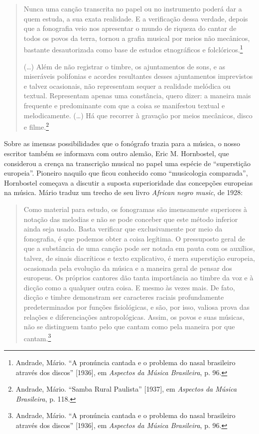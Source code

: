 \begin{quote}
Nunca uma canção transcrita no papel ou no instrumento poderá dar a quem
estuda, a sua exata realidade. E a verificação dessa verdade, depois que
a fonografia veio nos apresentar o mundo de riqueza do cantar de todos
os povos da terra, tornou a grafia musical por meios não mecânicos,
bastante desautorizada como base de estudos etnográficos e
folclóricos.\footnote{Andrade, Mário. ``A pronúncia cantada e o problema
  do nasal brasileiro através dos discos'' {[}1936{]}, em \emph{Aspectos
  da Música Brasileira}, p. 96.}

(\ldots{}) Além de não registrar o timbre, os ajuntamentos de sons, e as miseráveis
polifonias e acordes resultantes desses ajuntamentos imprevistos e
talvez ocasionais, não representam sequer a realidade melódica ou
textual. Representam apenas uma constância, quero dizer: a maneira mais
frequente e predominante com que a coisa se manifestou textual e
melodicamente. (\ldots{}) Há que recorrer à gravação por meios mecânicos,
disco e filme.\footnote{Andrade, Mário. ``Samba Rural Paulista''
  {[}1937{]}, em \emph{Aspectos da Música Brasileira}, p. 118.}
\end{quote}

Sobre as imensas possibilidades que o fonógrafo trazia para a música, o
nosso escritor também se informava com outro alemão, Eric M. Hornbostel,
que considerou a crença na transcrição musical no papel uma espécie de
``superstição europeia''. Pioneiro naquilo que ficou conhecido como
``musicologia comparada'', Hornbostel começava a discutir a suposta
superioridade das concepções europeias na música. Mário traduz um trecho
de seu livro \emph{African negro music}, de 1928:

\begin{quote}
Como material para estudo, os fonogramas são imensamente superiores à
notação das melodias e não se pode conceber que este método inferior
ainda seja usado. Basta verificar que exclusivamente por meio da \label{ref1}
fonografia, é que podemos obter a coisa legítima. O pressuposto geral de
que a substância de uma canção pode ser notada em pauta com os auxílios,
talvez, de sinais diacríticos e texto explicativo, é mera superstição
europeia, ocasionada pela evolução da música e a maneira geral de pensar
dos europeus. Os próprios cantores dão tanta importância ao timbre da
voz e à dicção como a qualquer outra coisa. E mesmo às vezes mais. De
fato, dicção e timbre demonstram ser caracteres raciais profundamente
predeterminados por funções fisiológicas, e são, por isso, valiosa prova
das relações e diferenciações antropológicas. Assim, os povos e suas
músicas, não se distinguem tanto pelo que cantam como pela maneira por
que cantam.\footnote{Andrade, Mário. ``A pronúncia cantada e o problema
  do nasal brasileiro através dos discos'' {[}1936{]}, em \emph{Aspectos
  da Música Brasileira}, p. 96.}
\end{quote}

